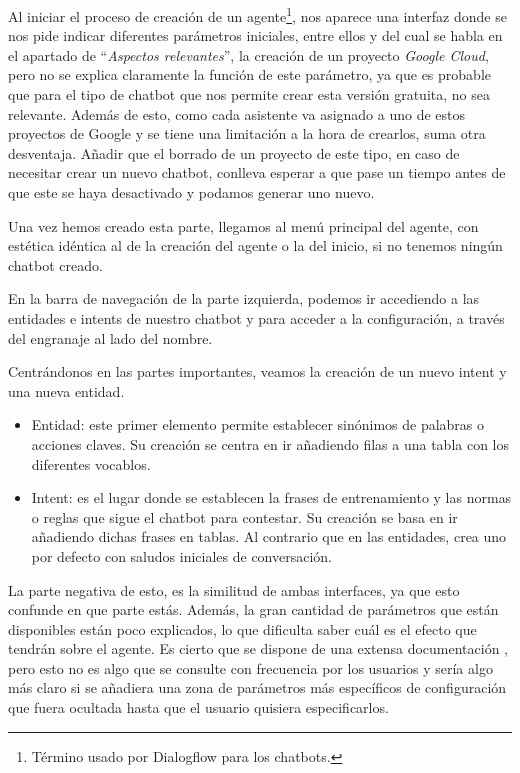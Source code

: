 Al iniciar el proceso de creación de un agente\footnote{Término usado por Dialogflow para los chatbots.}, nos aparece una interfaz donde se nos pide indicar diferentes parámetros iniciales, entre ellos y del cual se habla en el apartado de ``\textit{Aspectos relevantes}'', la creación de un proyecto \textit{Google Cloud}, pero no se explica claramente la función de este parámetro, ya que es probable que para el tipo de chatbot que nos permite crear esta versión gratuita, no sea relevante. Además de esto, como cada asistente va asignado a uno de estos proyectos de Google y se tiene una limitación a la hora de crearlos, suma otra desventaja. Añadir que el borrado de un proyecto de este tipo, en caso de necesitar crear un nuevo chatbot, conlleva esperar a que pase un tiempo antes de que este se haya desactivado y podamos generar uno nuevo.

Una vez hemos creado esta parte, llegamos al menú principal del agente, con estética idéntica al de la creación del agente o la del inicio, si no tenemos ningún chatbot creado.


En la barra de navegación de la parte izquierda, podemos ir accediendo a las entidades e intents de nuestro chatbot y para acceder a la configuración, a través del engranaje al lado del nombre. 

Centrándonos en las partes importantes, veamos la creación de un nuevo intent y una nueva entidad. 

\begin{itemize}
    \item Entidad: este primer elemento permite establecer sinónimos de palabras o acciones claves. Su creación se centra en ir añadiendo filas a una tabla con los diferentes vocablos.
    
    \item Intent: es el lugar donde se establecen la frases de entrenamiento y las normas o reglas que sigue el chatbot para contestar. Su creación se basa en ir añadiendo dichas frases en tablas. Al contrario que en las entidades, crea uno por defecto con saludos iniciales de conversación.
\end{itemize}

La parte negativa de esto, es la similitud de ambas interfaces, ya que esto confunde en que parte estás. Además, la gran cantidad de parámetros que están disponibles están poco explicados, lo que dificulta saber cuál es el efecto que tendrán sobre el agente. Es cierto que se dispone de una extensa documentación \cite{Document16:online}, pero esto no es algo que se consulte con frecuencia por los usuarios y sería algo más claro si se añadiera una zona de parámetros más específicos de configuración que fuera ocultada hasta que el usuario quisiera especificarlos.

